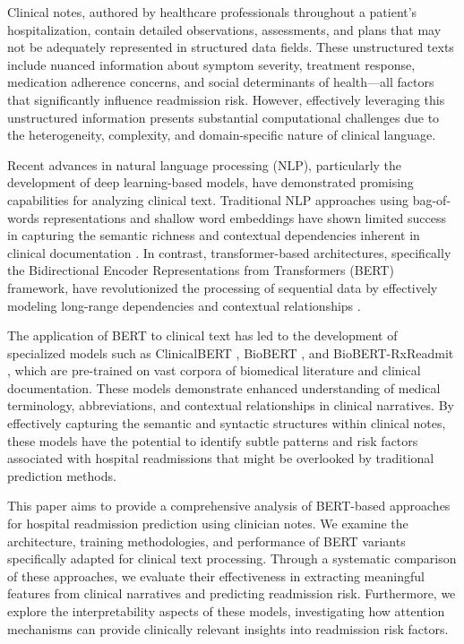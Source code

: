 \documentclass[3p,times,procedia]{elsarticle}
\begin{document}
Clinical notes, authored by healthcare professionals throughout a patient's hospitalization, contain detailed observations, assessments, and plans that may not be adequately represented in structured data fields. These unstructured texts include nuanced information about symptom severity, treatment response, medication adherence concerns, and social determinants of health—all factors that significantly influence readmission risk. However, effectively leveraging this unstructured information presents substantial computational challenges due to the heterogeneity, complexity, and domain-specific nature of clinical language.

Recent advances in natural language processing (NLP), particularly the development of deep learning-based models, have demonstrated promising capabilities for analyzing clinical text. Traditional NLP approaches using bag-of-words representations and shallow word embeddings have shown limited success in capturing the semantic richness and contextual dependencies inherent in clinical documentation \cite{Huang2020}. In contrast, transformer-based architectures, specifically the Bidirectional Encoder Representations from Transformers (BERT) framework, have revolutionized the processing of sequential data by effectively modeling long-range dependencies and contextual relationships \cite{Devlin2018}.

The application of BERT to clinical text has led to the development of specialized models such as ClinicalBERT \cite{Huang2020}, BioBERT \cite{Lee2020}, and BioBERT-RxReadmit \cite{Kumar2025}, which are pre-trained on vast corpora of biomedical literature and clinical documentation. These models demonstrate enhanced understanding of medical terminology, abbreviations, and contextual relationships in clinical narratives. By effectively capturing the semantic and syntactic structures within clinical notes, these models have the potential to identify subtle patterns and risk factors associated with hospital readmissions that might be overlooked by traditional prediction methods.

This paper aims to provide a comprehensive analysis of BERT-based approaches for hospital readmission prediction using clinician notes. We examine the architecture, training methodologies, and performance of BERT variants specifically adapted for clinical text processing. Through a systematic comparison of these approaches, we evaluate their effectiveness in extracting meaningful features from clinical narratives and predicting readmission risk. Furthermore, we explore the interpretability aspects of these models, investigating how attention mechanisms can provide clinically relevant insights into readmission risk factors.
\end{document}
